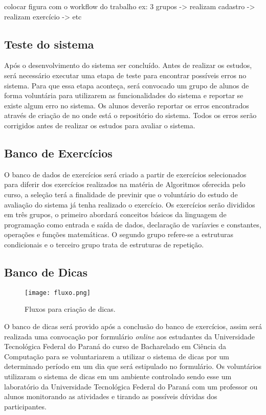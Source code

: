 colocar figura com o workflow do trabalho
ex: 3 grupos -> realizam cadastro -> realizam exercício -> etc

\subsection{Teste do sistema}

Após o desenvolvimento do sistema ser concluído. Antes de realizar os estudos, será necessário executar uma etapa de teste para encontrar possíveis erros no sistema. Para que essa etapa aconteça, será convocado um grupo de alunos de forma voluntária para utilizarem as funcionalidades do sistema e reportar se existe algum erro no sistema. Os alunos deverão reportar os erros encontrados através de criação de  no  onde está o repositório do sistema. Todos os erros serão corrigidos antes de realizar os estudos para avaliar o sistema.

\subsection{Banco de Exercícios}

O banco de dados de exercícios será criado a partir de exercícios selecionados para diferir dos exercícios realizados na matéria de Algoritmos oferecida pelo curso, a seleção terá a finalidade de previnir que o voluntário do estudo de avaliação do sistema já tenha realizado o exercício. Os exercícios serão divididos em três grupos, o primeiro abordará conceitos básicos da linguagem de programação como entrada e saída de dados, declaração de varíavies e constantes, operações e funções matemáticas. O segundo grupo refere-se a estruturas condicionais e o terceiro grupo trata de estruturas de repetição.

\subsection{Banco de Dicas}

\begin{figure}[ht]
	\captionsetup{justification=centering}
	\texttt{[image: fluxo.png]}
	\caption{Fluxos para criação de dicas.}
	\label{figura:dicafluxo}
\end{figure}


O banco de dicas será provido após a conclusão do banco de exercícios, assim será realizada uma convocação por formulário \textit{online} aos estudantes da Universidade Tecnológica Federal do Paraná do curso de Bacharelado em Ciência da Computação para se voluntariarem a utilizar o sistema de dicas por um determinado período em um dia que será estipulado no formulário. Os voluntários utilizaram o sistema de dicas em um ambiente controlado sendo esse um laboratório da Universidade Tecnológica Federal do Paraná com um professor ou alunos monitorando as atividades e tirando as possíveis dúvidas dos participantes. 

